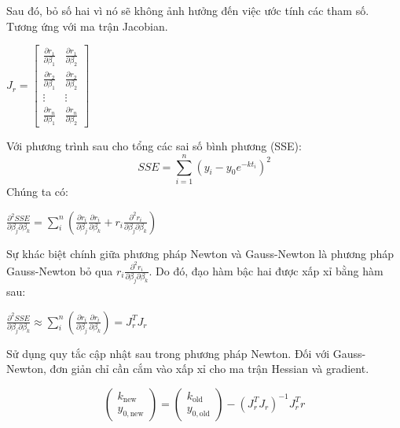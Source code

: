 \documentclass[conference]{IEEEtran}
\begin{document}
Sau đó, bỏ số hai vì nó sẽ không ảnh hưởng đến việc ước tính các tham số. Tương ứng với ma trận Jacobian.

\begin{center}
    \(
    J_r = \begin{bmatrix}
        \frac{\partial r_1}{\partial \beta_1} & \frac{\partial r_1}{\partial \beta_2} \\
        \frac{\partial r_2}{\partial \beta_1} & \frac{\partial r_2}{\partial \beta_2} \\
        \vdots                                & \vdots                                \\
        \frac{\partial r_n}{\partial \beta_1} & \frac{\partial r_n}{\partial \beta_2}
    \end{bmatrix}
    \)
\end{center}

Với phương trình sau cho tổng các sai số bình phương (SSE):
\[
    SSE = \sum_{i=1}^{n} (y_i - y_0 e^{-kt_i})^2
\]
Chúng ta có:
\begin{center}
    \(
    \frac{\partial^2 {SSE}}{\partial \beta_j \partial \beta_k} = \sum_{i}^{n} \left( \frac{\partial r_i}{\partial \beta_j} \frac{\partial r_i}{\partial \beta_k} + r_i \frac{\partial^2 r_i}{\partial \beta_j \partial \beta_k} \right)
    \)
\end{center}

Sự khác biệt chính giữa phương pháp Newton và Gauss-Newton là phương pháp Gauss-Newton bỏ qua \(r_i \frac{\partial^2 r_i}{\partial \beta_j \partial \beta_k}\).
Do đó, đạo hàm bậc hai được xấp xỉ bằng hàm sau:
\begin{center}
    \(
    \frac{\partial^2 {SSE}}{\partial \beta_j \partial \beta_k} \approx \sum_{i}^{n} \left( \frac{\partial r_i}{\partial \beta_j} \frac{\partial r_i}{\partial \beta_k} \right) = J^T_r J_r
    \)
\end{center}

Sử dụng quy tắc cập nhật sau trong phương pháp Newton. Đối với Gauss-Newton, đơn giản chỉ cần cắm vào xấp xỉ cho ma trận Hessian và gradient.

\begin{center}
    \[
        \begin{pmatrix}
            k_{\text{new}} \\ y_{0,\text{new}}
        \end{pmatrix} =
        \begin{pmatrix}
            k_{\text{old}} \\ y_{0,\text{old}}
        \end{pmatrix} - (J^T_r J_r)^{-1} J^T_r r
    \]
\end{center}
\end{document}
